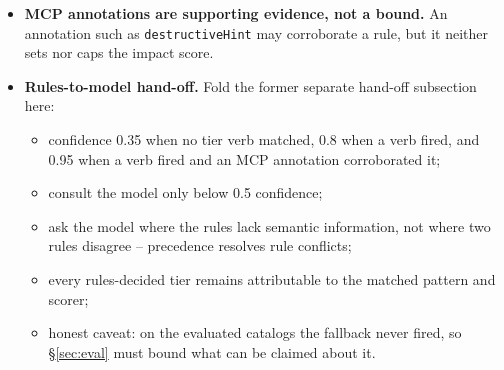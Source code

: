 \begin{itemize}
  \item \textbf{MCP annotations are supporting evidence, not a bound.}
        An annotation such as \texttt{destructiveHint} may corroborate a rule,
        but it neither sets nor caps the impact score.

  \item \textbf{Rules-to-model hand-off.} Fold the former separate hand-off
        subsection here:
    \begin{itemize}
      \item confidence 0.35 when no tier verb matched, 0.8 when a verb fired,
            and 0.95 when a verb fired and an MCP annotation corroborated it;
      \item consult the model only below 0.5 confidence;
      \item ask the model where the rules lack semantic information, not where
            two rules disagree -- precedence resolves rule conflicts;
      \item every rules-decided tier remains attributable to the matched pattern
            and scorer;
      \item honest caveat: on the evaluated catalogs the fallback never fired,
            so \S\ref{sec:eval} must bound what can be claimed about it.
    \end{itemize}
\end{itemize}

